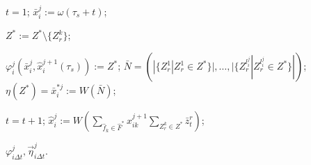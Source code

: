 	\Statex {}
	
	\State $t=1$;
	 \label{alst:cycle_start}
		\State $\bar{x}_i^j:=\omega(\tau_s+t)$;
	
			 \label{alst:update_z}
				\State $Z^*:=Z^*\setminus\{Z_r^k\}$;
			\EndIf
		\EndFor
	
		\State $\varphi_i^j(\bar x_i^j,\hat{x}_i^{j+1}(\tau_s)) := Z^*$; 
		\State $\bar N=(|\{Z_r^1|Z_r^1\in Z^*\}|,\dots,|\{Z_r^{l_i^j}|Z_r^{l_i^j}\in Z^*\}|)$; \label{alst:calc_out1}
		\State $\eta(Z^*)=\bar{x}_i^{*j}:=W(\bar N)$; \label{alst:calc_out3}
	
		\State $t=t+1$;
			\State $\hat{x}_i^j:=W(\sum_{\hat f_k\in\hat F^*}\hat x_{ik}^{j+1}\sum_{Z_r^k\in Z^*}\bar z_t^r)$; \label{alst:calc_state1}
		\EndIf
	\EndWhile \label{alst:cycle_end}
	
	\Return $\varphi_{i\Delta t}^j,\vec\eta_{i\Delta t}^j$.